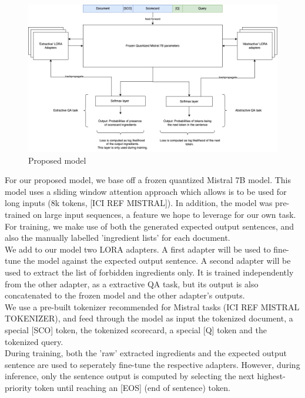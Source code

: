 \documentclass[11pt]{article}
\begin{document}
\\ 
\begin{figure}[btp]
    \centering
    \includegraphics[width=1\linewidth]{Model.drawio.png}
    \caption{Proposed model}
    \label{fig:enter-label}
\end{figure}
For our proposed model, we base off a frozen quantized Mistral 7B model. This model uses a sliding window attention approach which allows is to be used for long inputs (8k tokens, [ICI REF MISTRAL]). In addition, the model was pre-trained on large input sequences, a feature we hope to leverage for our own task.\\
For training, we make use of both the generated expected output sentences, and also the manually labelled 'ingredient lists' for each document. \\
We add to our model two LORA adapters. A first adapter will be used to fine-tune the model against the expected output sentence. A second adapter will be used to extract the list of forbidden ingredients only. It is trained independently from the other adapter, as a extractive QA task, but its output is also concatenated to the frozen model and the other adapter's outputs. \\
We use a pre-built tokenizer recommended for Mistral tasks (ICI REF MISTRAL TOKENIZER), and feed through the model as input the tokenized document, a special [SCO] token, the tokenized scorecard, a special [Q] token and the tokenized query. \\
During training, both the 'raw' extracted ingredients and the expected output sentence are used to seperately fine-tune the respective adapters. However, during inference, only the sentence output is computed by selecting the next highest-priority token until reaching an [EOS] (end of sentence) token. 
\end{document}
